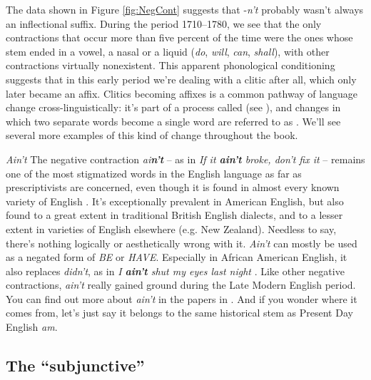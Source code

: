The data shown in Figure \ref{fig:NegCont} suggests that -\textit{n't} probably wasn't always an inflectional suffix. During the period 1710--1780, we see that the only contractions that occur more than five percent of the time were the ones whose stem ended in a vowel, a nasal or a liquid (\textit{do}, \textit{will}, \textit{can}, \textit{shall}), with other contractions virtually nonexistent. This apparent phonological conditioning suggests that in this early period we're dealing with a clitic after all, which only later became an affix. Clitics becoming affixes is a common pathway of language change cross-linguistically: it's part of a process called  (see ), and changes in which two separate words become a single word are referred to as . We'll see several more examples of this kind of change throughout the book.


\begin{miscbox}{\textit{Ain't}}
The negative contraction \textit{ai\textbf{n't}} -- as in \textit{If it \textbf{ain't} broke, don't fix it} -- remains one of the most stigmatized words in the English language as far as prescriptivists are concerned, even though it is found in almost every known variety of English \citep[311--316]{Anderwald2012}. It's exceptionally prevalent in American English, but also found to a great extent in traditional British English dialects, and to a lesser extent in varieties of English elsewhere (e.g. New Zealand). Needless to say, there's nothing logically or aesthetically wrong with it. \textit{Ain't} can mostly be used as a negated form of \emph{BE} or \emph{HAVE}. Especially in African American English, it also replaces \textit{didn't}, as in \textit{I \textbf{ain't} shut my eyes last night} \citep{Howe1997}. Like other negative contractions, \textit{ain't} really gained ground during the Late Modern English period. You can find out more about \textit{ain't} in the papers in \citet{DonaherKatz2015}. And if you wonder where it comes from, let's just say it belongs to the same historical stem as Present Day English \textit{am}.
\end{miscbox}


\subsection{The ``subjunctive''}\label{LModE-subjunctive}

